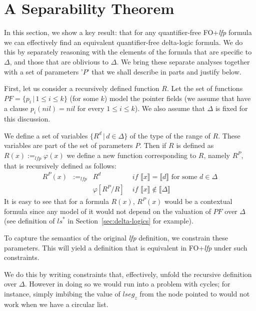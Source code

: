 	\section{A Separability Theorem}
\label{sec:separability}
In this section, we show a key result: that for any quantifier-free FO+\textit{lfp} formula we can effectively find an equivalent quantifier-free delta-logic formula. We do this by separately reasoning with the elements of the formula that are specific to $\Delta{}$, and those that are oblivious to $\Delta{}$. We bring these separate analyses together with a set of parameters '$P$' that we shall describe in parts and justify below.

First, let us consider a recursively defined function $R$. Let the set of functions $PF = \{ p_i \,|\, 1 \leq{} i \leq{} k \}$ (for some $k$) model the pointer fields (we assume that have a clause $p_i(nil) = nil$ for every $1 \leq{} i \leq{} k$). We also assume that $\Delta{}$ is fixed for this discussion.

We define a set of variables $\{R^{d}\,|\, d \in{} \Delta{} \}$ of the type of the range of $R$. These variables are part of the set of parameters $P$. Then if $R$ is defined as $R(x) :=_\textit{lfp} \varphi{}(x)$ we define a new function corresponding to $R$, namely $R^{P}$, that is recursively defined as follows:
\begin{align}
R^{P}(x) & :=_\textit{lfp} & R^{d} & \textit{ if } \llbracket{}x\rrbracket{} = \llbracket{} d \rrbracket{} \textrm{ for some } d \in{}\Delta{}\tag{delta case}\\
& & \varphi{}[R^{P}/R] & \textit{ if } \llbracket{}x\rrbracket{} \notin{} \llbracket{}\Delta{}\rrbracket{} \tag{recursive case}
\end{align}  
It is easy to see that for a formula $R(x)$, $R^{P}(x)$ would be a contextual formula since any model of it would not depend on the valuation of $PF$ over $\Delta{}$ (see definition of $\textit{ls}^*$ in Section~\ref{sec:delta-logics} for example).

To capture the semantics of the original \textit{lfp} definition, we constrain these parameters. This will yield a definition that is equivalent in FO+\textit{lfp} under such constraints.

We do this by writing constraints that, effectively, unfold the recursive definition over $\Delta{}$. However in doing so we would run into a problem with cycles; for instance, simply imbibing the value of $\textit{lseg}_{z}$ from the node pointed to would not work when we have a circular list.

